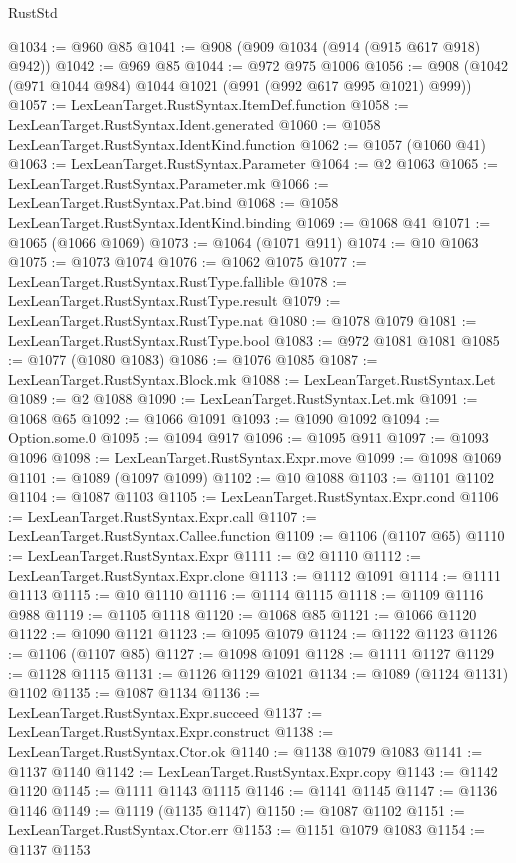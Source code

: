 \begin{lexlean}{RustStd}
\begin{coremodule}
@1034 := @960 @85
@1041 := @908 (@909 @1034 (@914 (@915 @617 @918) @942))
@1042 := @969 @85
@1044 := @972 @975 @1006
@1056 := @908 (@1042 (@971 @1044 @984) @1044 @1021 (@991 (@992 @617 @995 @1021) @999))
@1057 := LexLeanTarget.RustSyntax.ItemDef.function
@1058 := LexLeanTarget.RustSyntax.Ident.generated
@1060 := @1058 LexLeanTarget.RustSyntax.IdentKind.function
@1062 := @1057 (@1060 @41)
@1063 := LexLeanTarget.RustSyntax.Parameter
@1064 := @2 @1063
@1065 := LexLeanTarget.RustSyntax.Parameter.mk
@1066 := LexLeanTarget.RustSyntax.Pat.bind
@1068 := @1058 LexLeanTarget.RustSyntax.IdentKind.binding
@1069 := @1068 @41
@1071 := @1065 (@1066 @1069)
@1073 := @1064 (@1071 @911)
@1074 := @10 @1063
@1075 := @1073 @1074
@1076 := @1062 @1075
@1077 := LexLeanTarget.RustSyntax.RustType.fallible
@1078 := LexLeanTarget.RustSyntax.RustType.result
@1079 := LexLeanTarget.RustSyntax.RustType.nat
@1080 := @1078 @1079
@1081 := LexLeanTarget.RustSyntax.RustType.bool
@1083 := @972 @1081 @1081
@1085 := @1077 (@1080 @1083)
@1086 := @1076 @1085
@1087 := LexLeanTarget.RustSyntax.Block.mk
@1088 := LexLeanTarget.RustSyntax.Let
@1089 := @2 @1088
@1090 := LexLeanTarget.RustSyntax.Let.mk
@1091 := @1068 @65
@1092 := @1066 @1091
@1093 := @1090 @1092
@1094 := Option.some.{0}
@1095 := @1094 @917
@1096 := @1095 @911
@1097 := @1093 @1096
@1098 := LexLeanTarget.RustSyntax.Expr.move
@1099 := @1098 @1069
@1101 := @1089 (@1097 @1099)
@1102 := @10 @1088
@1103 := @1101 @1102
@1104 := @1087 @1103
@1105 := LexLeanTarget.RustSyntax.Expr.cond
@1106 := LexLeanTarget.RustSyntax.Expr.call
@1107 := LexLeanTarget.RustSyntax.Callee.function
@1109 := @1106 (@1107 @65)
@1110 := LexLeanTarget.RustSyntax.Expr
@1111 := @2 @1110
@1112 := LexLeanTarget.RustSyntax.Expr.clone
@1113 := @1112 @1091
@1114 := @1111 @1113
@1115 := @10 @1110
@1116 := @1114 @1115
@1118 := @1109 @1116 @988
@1119 := @1105 @1118
@1120 := @1068 @85
@1121 := @1066 @1120
@1122 := @1090 @1121
@1123 := @1095 @1079
@1124 := @1122 @1123
@1126 := @1106 (@1107 @85)
@1127 := @1098 @1091
@1128 := @1111 @1127
@1129 := @1128 @1115
@1131 := @1126 @1129 @1021
@1134 := @1089 (@1124 @1131) @1102
@1135 := @1087 @1134
@1136 := LexLeanTarget.RustSyntax.Expr.succeed
@1137 := LexLeanTarget.RustSyntax.Expr.construct
@1138 := LexLeanTarget.RustSyntax.Ctor.ok
@1140 := @1138 @1079 @1083
@1141 := @1137 @1140
@1142 := LexLeanTarget.RustSyntax.Expr.copy
@1143 := @1142 @1120
@1145 := @1111 @1143 @1115
@1146 := @1141 @1145
@1147 := @1136 @1146
@1149 := @1119 (@1135 @1147)
@1150 := @1087 @1102
@1151 := LexLeanTarget.RustSyntax.Ctor.err
@1153 := @1151 @1079 @1083
@1154 := @1137 @1153

\end{coremodule}
\end{lexlean}
